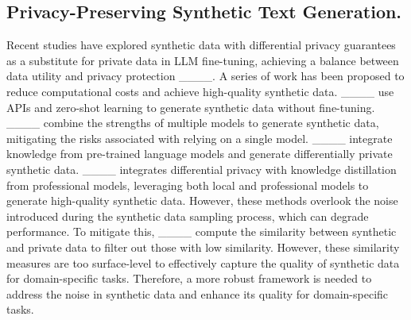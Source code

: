 \subsection{Privacy-Preserving Synthetic Text Generation.}
Recent studies have explored synthetic data with differential privacy guarantees as a substitute for private data in LLM fine-tuning, achieving a balance between data utility and privacy protection ____. 
A series of work has been proposed to reduce computational costs and achieve high-quality synthetic data. 
____ use APIs and zero-shot learning to generate synthetic data without fine-tuning. 
____ combine the strengths of multiple models to generate synthetic data, mitigating the risks associated with relying on a single model.
____ integrate knowledge from pre-trained language models and generate differentially private synthetic data.
____ integrates differential privacy with knowledge distillation from professional models, leveraging both local and professional models to generate high-quality synthetic data. 
However, these methods overlook the noise introduced during the synthetic data sampling process, which can degrade performance. 
To mitigate this, ____ compute the similarity between synthetic and private data to filter out those with low similarity. 
However, these similarity measures are too surface-level to effectively capture the quality of synthetic data for domain-specific tasks. 
Therefore, a more robust framework is needed to address the noise in synthetic data and enhance its quality for domain-specific tasks.

